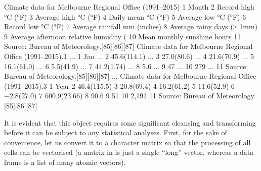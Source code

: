 \documentclass[nojss]{jss}
\begin{document}
\begin{Schunk}
\begin{Soutput}
   Climate data for Melbourne Regional Office (1991–2015)
1                                                   Month
2                                     Record high °C (°F)
3                                    Average high °C (°F)
4                                      Daily mean °C (°F)
5                                     Average low °C (°F)
6                                      Record low °C (°F)
7                            Average rainfall mm (inches)
8                              Average rainy days (≥ 1mm)
9                 Average afternoon relative humidity (%)
10                            Mean monthly sunshine hours
11             Source: Bureau of Meteorology.[85][86][87]
   Climate data for Melbourne Regional Office (1991–2015).1 ...
1                                                       Jan ...
2                                               45.6(114.1) ...
3                                                27.0(80.6) ...
4                                                21.6(70.9) ...
5                                                16.1(61.0) ...
6                                                 5.5(41.9) ...
7                                                44.2(1.74) ...
8                                                       5.6 ...
9                                                        47 ...
10                                                      279 ...
11               Source: Bureau of Meteorology.[85][86][87] ...
   Climate data for Melbourne Regional Office (1991–2015).3
1                                                      Year
2                                               46.4(115.5)
3                                                20.8(69.4)
4                                                16.2(61.2)
5                                                11.6(52.9)
6                                                −2.8(27.0)
7                                              600.9(23.66)
8                                                      90.6
9                                                        51
10                                                    2,191
11               Source: Bureau of Meteorology.[85][86][87]
\end{Soutput}
\end{Schunk}

It is evident that this object requires some significant
cleansing and transforming before it can be subject
to any statistical analyses.
First, for the sake of convenience, let us convert it
to a character matrix so that the processing of all cells can
be vectorised
(a matrix in  is just a single ``long'' vector,
whereas a data frame is a list of many atomic vectors).
\end{document}
